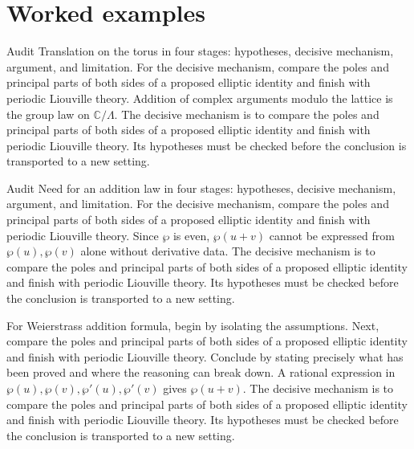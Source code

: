 \section{Worked examples}

\begin{example}\label{ex:iv30-worked-01}
Audit Translation on the torus in four stages: hypotheses, decisive mechanism, argument, and limitation. For the decisive mechanism, compare the poles and principal parts of both sides of a proposed elliptic identity and finish with periodic Liouville theory. Addition of complex arguments modulo the lattice is the group law on $\mathbb C/\Lambda$. The decisive mechanism is to compare the poles and principal parts of both sides of a proposed elliptic identity and finish with periodic Liouville theory. Its hypotheses must be checked before the conclusion is transported to a new setting.
\end{example}

\begin{example}\label{ex:iv30-worked-02}
Audit Need for an addition law in four stages: hypotheses, decisive mechanism, argument, and limitation. For the decisive mechanism, compare the poles and principal parts of both sides of a proposed elliptic identity and finish with periodic Liouville theory. Since $\wp$ is even, $\wp(u+v)$ cannot be expressed from $\wp(u),\wp(v)$ alone without derivative data. The decisive mechanism is to compare the poles and principal parts of both sides of a proposed elliptic identity and finish with periodic Liouville theory. Its hypotheses must be checked before the conclusion is transported to a new setting.
\end{example}

\begin{example}\label{ex:iv30-worked-03}
For Weierstrass addition formula, begin by isolating the assumptions. Next, compare the poles and principal parts of both sides of a proposed elliptic identity and finish with periodic Liouville theory. Conclude by stating precisely what has been proved and where the reasoning can break down. A rational expression in $\wp(u),\wp(v),\wp'(u),\wp'(v)$ gives $\wp(u+v)$. The decisive mechanism is to compare the poles and principal parts of both sides of a proposed elliptic identity and finish with periodic Liouville theory. Its hypotheses must be checked before the conclusion is transported to a new setting.
\end{example}

